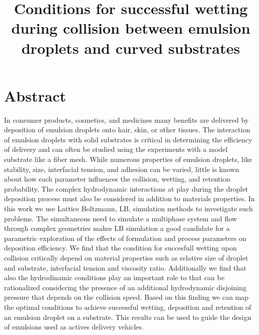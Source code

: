 \documentclass{article}
\title{Conditions for successful wetting during collision between emulsion droplets and curved substrates}
\begin{document}
\maketitle
\section{Abstract}
In consumer products, cosmetics, and medicines many benefits are delivered by deposition of emulsion droplets onto hair, skin, or other tissues.
The interaction of emulsion droplets with solid substrates is critical in determining the efficiency of delivery and can often be studied using the experiments with a model substrate like a fiber mesh. While numerous properties of emulsion droplets, like stability, size, interfacial tension, and adhesion can be varied, little is known about how each parameter influences the collision, wetting, and retention probability.  The complex hydrodynamic interactions at play during the droplet deposition process must also be considered in addition to materials properties. In this work we use Lattice Boltzmann, LB, simulation methods to investigate such problems. The simultaneous need to simulate a multiphase system and flow through complex geometries makes LB simulation a good candidate for a parametric exploration of the effects of formulation and process parameters on deposition efficiency. We find that the condition for succesfull wetting upon collision critically depend on material properties such as relative size of droplet and substrate, interfacial tension and viscosity ratio. Additionally we find that also the hydrodinamic conditions play an important role to that can be rationalized considering the presence of an additional hydrodynamic disjoining pressure that depends on the collision speed. Based on this finding we can map the optimal conditions to achieve successful wetting, deposition and retention of an emulsion droplet on a substrate. This results can be used to guide the design of emulsions used as actives delivery vehicles. 

\pagebreak
\end{document}
